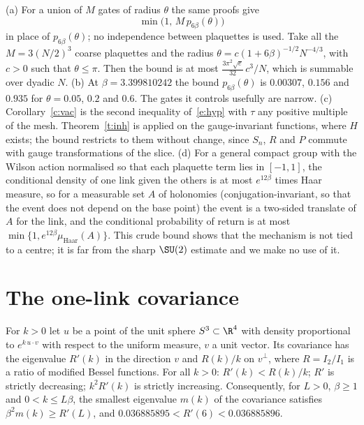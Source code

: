 \begin{remark}\label{r:ret}
(a) For a union of $M$ gates of radius $\theta$ the same proofs give
\[\min\big(1,\,M\,p_{6\beta}(\theta)\big)\]
in place of $p_{6\beta}(\theta)$; no independence between plaquettes is used. Take all the
$M=3(N/2)^3$ coarse plaquettes and the radius $\theta=c(1+6\beta)^{-1/2}N^{-4/3}$, with $c>0$ such that
$\theta\le\pi$. Then the bound is at most $\tfrac{3\pi^2\sqrt e}{32}\,c^3/N$, which is summable over dyadic $N$.
(b) At $\beta=3.399810242$ the bound $p_{6\beta}(\theta)$ is $0.00307$, $0.156$ and $0.935$ for
$\theta=0.05$, $0.2$ and $0.6$. The gates it controls usefully are narrow. (c) Corollary~\ref{c:vac} is the
second inequality of~\eqref{e:hyp} with $\tau$ any positive multiple of the mesh. Theorem~\ref{t:inh} is applied on the gauge-invariant functions, where $H$ exists; the bound restricts to
them without change, since $S_n$, $R$ and $P$ commute with gauge transformations of the slice. (d) For a general compact group with the Wilson action normalised so that each plaquette term lies in
$[-1,1]$, the conditional density of one link given the others is at most $e^{12\beta}$ times Haar measure,
so for a measurable set $A$ of holonomies (conjugation-invariant, so that the event does not depend on the
base point) the event is a two-sided translate of $A$ for the link, and the conditional probability of return
is at most $\min\{1,e^{12\beta}\mu_{\mathrm{Haar}}(A)\}$. This crude bound shows that the mechanism is not tied to a
centre; it is far from the sharp $\SU(2)$ estimate and we make no use of it.
\end{remark}

\section{The one-link covariance}\label{s:haar}
\begin{proposition}\label{p:haar}
For $k>0$ let $u$ be a point of the unit sphere $S^3\subset\R^4$ with density proportional to
$e^{k\,u\cdot v}$ with respect to the uniform measure, $v$ a unit vector. Its covariance has the eigenvalue
$R'(k)$ in the direction $v$ and $R(k)/k$ on $v^\perp$, where $R=I_2/I_1$ is a ratio of modified Bessel
functions. For all $k>0$: $R'(k)<R(k)/k$; $R'$ is strictly decreasing; $k^2R'(k)$ is strictly increasing.
Consequently, for $L>0$, $\beta\ge1$ and $0<k\le L\beta$, the smallest eigenvalue $m(k)$ of the covariance
satisfies $\beta^2m(k)\ge R'(L)$, and $0.036885895<R'(6)<0.036885896$.
\end{proposition}


